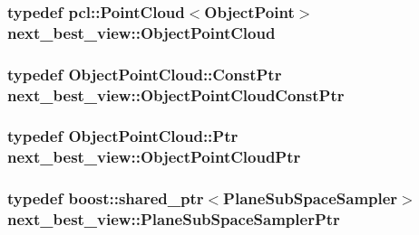 \hypertarget{namespacenext__best__view_a8f34dc68b2ea59f714017595a2e0a728}{
\subsubsection[{\-Object\-Point\-Cloud}]{\setlength{\rightskip}{0pt plus 5cm}typedef pcl\-::\-Point\-Cloud$<${\bf \-Object\-Point}$>$ {\bf next\-\_\-best\-\_\-view\-::\-Object\-Point\-Cloud}}}\label{namespacenext__best__view_a8f34dc68b2ea59f714017595a2e0a728}
\hypertarget{namespacenext__best__view_a5d5064a7af2a815261264964022c84b8}{
\subsubsection[{\-Object\-Point\-Cloud\-Const\-Ptr}]{\setlength{\rightskip}{0pt plus 5cm}typedef \-Object\-Point\-Cloud\-::\-Const\-Ptr {\bf next\-\_\-best\-\_\-view\-::\-Object\-Point\-Cloud\-Const\-Ptr}}}\label{namespacenext__best__view_a5d5064a7af2a815261264964022c84b8}
\hypertarget{namespacenext__best__view_af8b3b448f67ab117bb7c59bc7c34f0b3}{
\subsubsection[{\-Object\-Point\-Cloud\-Ptr}]{\setlength{\rightskip}{0pt plus 5cm}typedef \-Object\-Point\-Cloud\-::\-Ptr {\bf next\-\_\-best\-\_\-view\-::\-Object\-Point\-Cloud\-Ptr}}}\label{namespacenext__best__view_af8b3b448f67ab117bb7c59bc7c34f0b3}
\hypertarget{namespacenext__best__view_a9195bbe041d02540324d6a4d33560eef}{
\subsubsection[{\-Plane\-Sub\-Space\-Sampler\-Ptr}]{\setlength{\rightskip}{0pt plus 5cm}typedef boost\-::shared\-\_\-ptr$<${\bf \-Plane\-Sub\-Space\-Sampler}$>$ {\bf next\-\_\-best\-\_\-view\-::\-Plane\-Sub\-Space\-Sampler\-Ptr}}}\label{namespacenext__best__view_a9195bbe041d02540324d6a4d33560eef}


